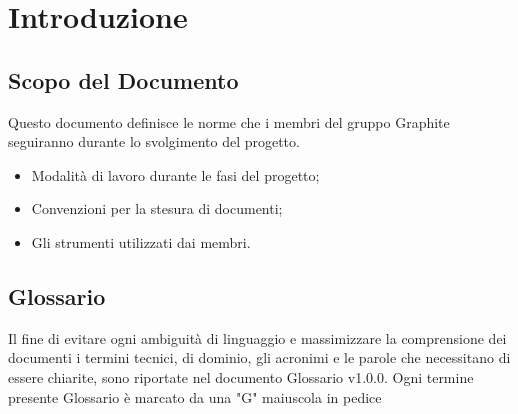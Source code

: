 \documentclass[./AnalisideiRequisiti.tex]{subfiles}
\begin{document}
	
\chapter{Introduzione}
\section{Scopo del Documento}
Questo documento definisce le norme che i membri del gruppo Graphite seguiranno durante lo svolgimento del progetto.
\begin{itemize}
\item Modalità di lavoro durante le fasi del progetto;
\item Convenzioni per la stesura di documenti;
\item Gli strumenti utilizzati dai membri.

\end{itemize}
\section{Glossario}
Il fine di evitare ogni ambiguità di linguaggio e massimizzare la comprensione dei documenti i termini tecnici, di dominio, gli acronimi e le parole che necessitano di essere chiarite, sono riportate nel documento Glossario v1.0.0.
Ogni termine presente Glossario è marcato da una "G" maiuscola in pedice
\end{document}
